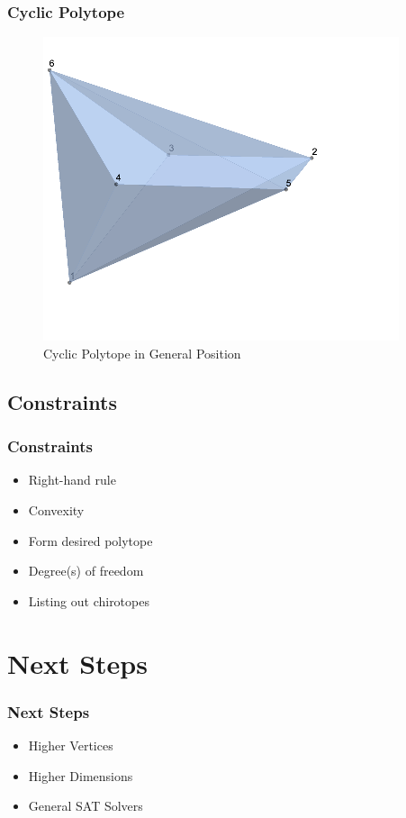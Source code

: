 \documentclass{beamer}
\begin{document}

\begin{frame}
\frametitle{Cyclic Polytope}
    \begin{figure}[h] %
        \includegraphics[scale = 0.4]{Cyclic.png} %
        \caption{Cyclic Polytope in General Position}
    \end{figure}
\end{frame}


\subsection{Constraints}
\begin{frame}
    \frametitle{Constraints}
    \begin{itemize}
        \item Right-hand rule
        \item Convexity
        \item Form desired polytope
        \item Degree(s) of freedom
        \item Listing out chirotopes
    \end{itemize}
\end{frame}
   

\section{Next Steps}

\begin{frame}
    \frametitle{Next Steps}
    \begin{itemize}
        \item Higher Vertices
        \item Higher Dimensions
        \item General SAT Solvers
    \end{itemize}
\end{frame}
   
    
\end{document}
